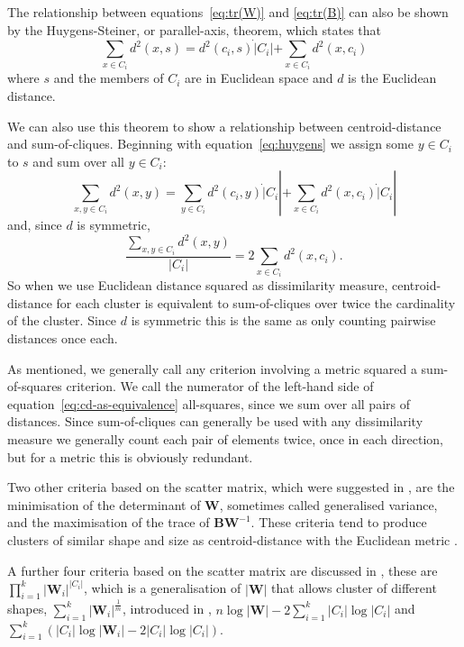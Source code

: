 \documentclass[a4paper]{report}
\begin{document}
The relationship between equations~\eqref{eq:tr(W)} and \eqref{eq:tr(B)} can
also be shown by the Huygens-Steiner, or parallel-axis, theorem, which states
that
\begin{equation}
  \label{eq:huygens}
  \sum_{x \in C_i} d^2(x,s) = d^2(c_i,s) \dot |C_i| + \sum_{x \in C_i} d^2(x,c_i)
\end{equation}
where $s$ and the members of $C_i$ are in Euclidean space and $d$ is the
Euclidean distance.

We can also use this theorem to show a relationship between centroid-distance
and sum-of-cliques.  Beginning with equation~\eqref{eq:huygens} we assign some
$y \in C_i$ to $s$ and sum over all $y \in C_i$:
\begin{equation*}
  \sum_{x,y \in C_i} d^2(x,y) = \sum_{y \in C_i} d^2(c_i,y) \dot |C_i|
                           + \sum_{x \in C_i} d^2(x,c_i) \dot |C_i|
\end{equation*}
and, since $d$ is symmetric,
\begin{equation}
  \label{eq:cd-as-equivalence}
  \frac{\displaystyle \sum_{x,y \in C_i} d^2(x,y)}
       {|C_i|}
  = 2 \sum_{x \in C_i} d^2(x,c_i).
\end{equation}
So when we use Euclidean distance squared as dissimilarity measure,
centroid-distance for each cluster is equivalent to sum-of-cliques over twice
the cardinality of the cluster.  Since $d$ is symmetric this is the same as
only counting pairwise distances once each.

As mentioned, we generally call any criterion involving a metric squared a
sum-of-squares criterion.  We call the numerator of the left-hand side of
equation~\eqref{eq:cd-as-equivalence} all-squares, since we sum over all pairs
of distances.  Since sum-of-cliques can generally be used with any
dissimilarity measure we generally count each pair of elements twice, once in
each direction, but for a metric this is obviously redundant.

Two other criteria based on the scatter matrix, which were suggested in
\citet{friedman1967criteria}, are the minimisation of the determinant of
$\mathbf{W}$, sometimes called generalised variance, and the maximisation of
the trace of $\mathbf{BW}^{-1}$.  These criteria tend to produce clusters of
similar shape and size as centroid-distance with the Euclidean metric
\citep{marriott1982optimization}.

A further four criteria based on the scatter matrix are discussed in
\citep{marriott1982optimization}, these are
$\prod_{i=1}^{k}|\mathbf{W}_i|^{|C_i|}$, which is a generalisation of
$|\mathbf{W}|$ that allows cluster of different shapes,
$\sum_{i=1}^{k}|\mathbf{W}_i|^{\frac{1}{m}}$, introduced in
\citep{maronna1974}, $n \log{|\mathbf{W}|} - 2\sum_{i=1}^{k} |C_i|
\log{|C_i|}$ and $\sum_{i=1}^{k} (|C_i| \log{|\mathbf{W}_i|} -
2|C_i|\log{|C_i|})$.
\end{document}
